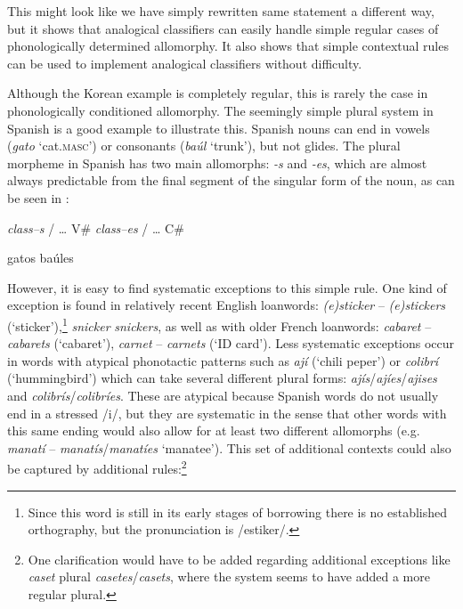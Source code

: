 \largerpage
This might look like we have simply rewritten same statement a different way, but it shows that analogical classifiers can easily handle simple regular cases of phonologically determined allomorphy.
It also shows that simple contextual rules can be used to implement analogical classifiers without difficulty.

Although the Korean example is completely regular, this is rarely the case in phonologically conditioned allomorphy. The seemingly simple plural system in Spanish is a good example to illustrate this. Spanish nouns can end in vowels (\textit{gato} `cat.\textsc{masc}') or consonants (\textit{baúl} `trunk'), but not glides. The plural morpheme in Spanish has two main allomorphs: \textit{-s} and \textit{-es}, which are almost always predictable from the final segment of the singular form of the noun, as can be seen in :

\begin{exe}
    \ex \label{exe-sp-plurals}
    \begin{xlist}
        \ex \textit{class--s} / \dots{} V\#
        \ex \textit{class--es} / \dots{} C\#
    \end{xlist}
    \ex
    \begin{xlist}
        \ex gatos
        \ex baúles
    \end{xlist}
\end{exe}

However, it is easy to find systematic exceptions to this simple rule. One kind of  exception is found in relatively recent English loanwords: \textit{(e)sticker} -- \textit{(e)stickers} (`sticker'),\footnote{Since this word is still in its early stages of borrowing there is no established orthography, but the pronunciation is /estiker/.} \textit{snicker} \textit{snickers}, as well as with older French loanwords: \textit{cabaret} -- \textit{cabarets} (`cabaret'), \textit{carnet} -- \textit{carnets} (`ID card'). Less systematic exceptions occur in words with atypical phonotactic patterns such as \textit{ají} (`chili peper') or \textit{colibrí} (`hummingbird') which can take several different plural forms: \textit{ajís}/\textit{ajíes}/\textit{ajises} and \textit{colibrís}/\textit{colibríes}. These are atypical because Spanish words do not usually end in a stressed /i/, but they are systematic in the sense that other words with this same ending would also allow for at least two different allomorphs (e.g. \textit{manatí} -- \textit{manatís}/\textit{manatíes} `manatee'). This set of additional contexts could also be captured by additional rules:\footnote{One clarification would have to be added regarding additional exceptions like \textit{caset} plural \textit{casetes}/\textit{casets}, where the system seems to have added a more regular plural.}

